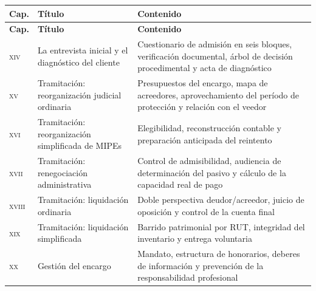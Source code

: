{\small
\begin{longtable}{@{}p{}p{}p{}@{}}
\toprule
\textbf{Cap.} & \textbf{Título} & \textbf{Contenido} \\
\midrule
\endfirsthead
\toprule
\textbf{Cap.} & \textbf{Título} & \textbf{Contenido} \\
\midrule
\endhead
\bottomrule
\endfoot

\textsc{xiv} & La entrevista inicial y el diagnóstico del cliente
& Cuestionario de admisión en seis bloques, verificación documental, árbol de decisión
procedimental y acta de diagnóstico \\
\addlinespace
\textsc{xv} & Tramitación: reorganización judicial ordinaria
& Presupuestos del encargo, mapa de acreedores, aprovechamiento del período de protección
y relación con el veedor \\
\addlinespace
\textsc{xvi} & Tramitación: reorganización simplificada de MIPEs
& Elegibilidad, reconstrucción contable y preparación anticipada del reintento \\
\addlinespace
\textsc{xvii} & Tramitación: renegociación administrativa
& Control de admisibilidad, audiencia de determinación del pasivo y cálculo de la
capacidad real de pago \\
\addlinespace
\textsc{xviii} & Tramitación: liquidación ordinaria
& Doble perspectiva deudor/acreedor, juicio de oposición y control de la cuenta final \\
\addlinespace
\textsc{xix} & Tramitación: liquidación simplificada
& Barrido patrimonial por RUT, integridad del inventario y entrega voluntaria \\
\addlinespace
\textsc{xx} & Gestión del encargo
& Mandato, estructura de honorarios, deberes de información y prevención de la
responsabilidad profesional \\
\end{longtable}}

\cleardoublepage

